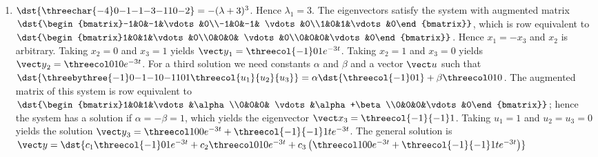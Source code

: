 \documentclass[openany]{book}
\newenvironment{sectionSolutions}{
 \begin{enumerate}[item-label={\thesection.\arabic{enumi}.}]
}{
 \end{enumerate}
}
\begin{document}
\begin{sectionSolutions}
\item
$\dst{\threechar{-4}0{-1}{-1}{-3}{-1}10{-2}}
=-(\lambda+3)^3$.
Hence $\lambda_1=3$.
The eigenvectors
 satisfy the system with  augmented matrix
$\dst{\begin{bmatrix}-1&0&-1&\vdots&0\\-1&0&-1&
\vdots&0\\1&0&1&\vdots&0\end{bmatrix}}$,
which is row equivalent to
$\dst{\begin{bmatrix}1&0&1&\vdots&0\\0&0&0&
\vdots&0\\0&0&0&\vdots&0\end{bmatrix}}$.
Hence  $x_1=-x_3$ and $x_2$ is arbitrary.  Taking $x_2=0$ and $x_3=1$
yields
${\vect y}_1=\threecol{-1}01e^{-3t}$.
Taking $x_2=1$ and $x_3=0$
yields  ${\vect y}_2=\threecol010e^{-3t}$.
For a third solution we need constants $\alpha$ and $\beta$  and a
vector ${\vect u}$ such that
$\dst{\threebythree{-1}0{-1}{-1}0{-1}101\threecol{u_1}{u_2}{u_3}}
=\alpha\dst{\threecol{-1}01}+\beta\threecol010$.
The augmented matrix of this system is row equivalent to
$\dst{\begin{bmatrix}1&0&1&\vdots&\alpha\\0&0&0&
\vdots&\alpha+\beta\\0&0&0&\vdots&0\end{bmatrix}}$;
hence the system
has a solution if $\alpha=-\beta=1$, which yields the eigenvector
${\vect x}_3=\threecol{-1}{-1}1$. Taking $u_1=1$  and $u_2=u_3=0$
yields the solution
${\vect y}_3=\threecol100e^{-3t}+\threecol{-1}{-1}1te^{-3t}$.
The general solution is
${\vect
y}=\dst{c_1\threecol{-1}01e^{-3t}+c_2\threecol010e^{-3t}+c_3\left
(\threecol100e^{-3t}+\threecol{-1}{-1}1te^{-3t}\right)}$



\end{sectionSolutions}
\end{document}
